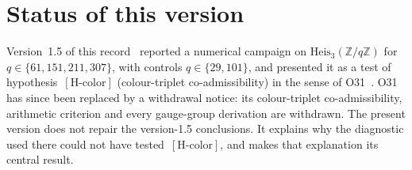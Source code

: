 \documentclass[12pt,a4paper]{article}
\theoremstyle{definition}
\theoremstyle{remark}
\newcommand{\Heis}{\mathrm{Heis}_3}
\newcommand{\Zq}{\mathbb{Z}/q\mathbb{Z}}
\newcommand{\Hcolor}{[\mathrm{H\text{-}color}]}
\begin{document}
  \clearpage
  \tableofcontents
  \clearpage

  \section{Status of this version}
  \label{sec:status}

  Version~1.5 of this record~\cite{Beau2026a36v15} reported a numerical campaign on
  $\Heis(\Zq)$ for $q\in\{61,151,211,307\}$, with controls $q\in\{29,101\}$, and presented
  it as a test of hypothesis~$\Hcolor$ (colour-triplet co-admissibility) in the sense of
  O31~\cite{Beau2026a35}.
  O31 has since been replaced by a withdrawal notice: its colour-triplet co-admissibility,
  arithmetic criterion and every gauge-group derivation are withdrawn.
  The present version does not repair the version-1.5 conclusions.
  It explains why the diagnostic used there could not have tested~$\Hcolor$, and makes that
  explanation its central result.
\end{document}
